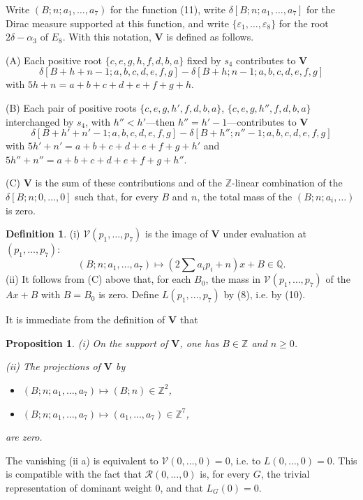 \documentclass[11pt,a4paper]{article}
\theoremstyle{plain}
\newtheorem{proposition}[theorem]{Proposition}
\theoremstyle{definition}
\newtheorem{definition}[theorem]{Definition}
\begin{document}
Write $(B;n;a_1,\ldots,a_7)$ for the function (11), write $\delta[B;n;a_1,\ldots,a_7]$ for the Dirac measure supported at this function, and write $\{\varepsilon_1,\ldots,\varepsilon_8\}$ for the root $2\delta-\alpha_3$ of $E_8$. With this notation, $\mathbf V$ is defined as follows.

\smallskip
\noindent(A) Each positive root $\{c,e,g,h,f,d,b,a\}$ fixed by $s_4$ contributes to $\mathbf V$
\[
\delta[B+h+n-1; a,b,c,d,e,f,g]-\delta[B+h; n-1; a,b,c,d,e,f,g]
\]
with $5h+n=a+b+c+d+e+f+g+h$.

\smallskip
\noindent(B) Each pair of positive roots $\{c,e,g,h',f,d,b,a\}$, $\{c,e,g,h'',f,d,b,a\}$ interchanged by $s_4$, with $h''<h'$---then $h''=h'-1$---contributes to $\mathbf V$
\[
\delta[B+h'+n'-1; a,b,c,d,e,f,g]-\delta[B+h''; n''-1; a,b,c,d,e,f,g]
\]
with $5h'+n'=a+b+c+d+e+f+g+h'$ and $5h''+n''=a+b+c+d+e+f+g+h''$.

\smallskip
\noindent(C) $\mathbf V$ is the sum of these contributions and of the $\mathbb Z$-linear combination of the $\delta[B;n;0,\ldots,0]$ such that, for every $B$ and $n$, the total mass of the $(B;n;a_i,\ldots)$ is zero.

\begin{definition}
\textup{(i)} $\mathcal V(p_1,\ldots,p_7)$ is the image of $\mathbf V$ under evaluation at $(p_1,\ldots,p_7)$:
\[
(B;n;a_1,\ldots,a_7)\longmapsto \left(2\sum a_i p_i+n\right)x+B\in\mathbb Q.
\]
\textup{(ii)} It follows from (C) above that, for each $B_0$, the mass in $\mathcal V(p_1,\ldots,p_7)$ of the $Ax+B$ with $B=B_0$ is zero. Define $L(p_1,\ldots,p_7)$ by (8), i.e. by (10).
\end{definition}

It is immediate from the definition of $\mathbf V$ that
\begin{proposition}\label{prop:1}
\textup{(i)} On the support of $\mathbf V$, one has $B\in\mathbb Z$ and $n\geq0$.

\textup{(ii)} The projections of $\mathbf V$ by
\begin{itemize}
\item[(a)] $(B;n;a_1,\ldots,a_7)\mapsto (B;n)\in\mathbb Z^2$,
\item[(b)] $(B;n;a_1,\ldots,a_7)\mapsto (a_1,\ldots,a_7)\in\mathbb Z^7$,
\end{itemize}
are zero.
\end{proposition}

The vanishing (ii a) is equivalent to $\mathcal V(0,\ldots,0)=0$, i.e. to $L(0,\ldots,0)=0$. This is compatible with the fact that $\mathcal R(0,\ldots,0)$ is, for every $G$, the trivial representation of dominant weight $0$, and that $L_G(0)=0$.
\end{document}
